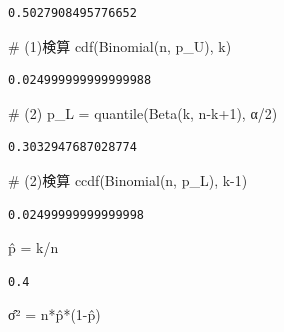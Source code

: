 \documentclass[
  letterpaper,
  DIV=11,
  numbers=noendperiod]{scrartcl}
\newenvironment{Shaded}{\begin{snugshade}}{\end{snugshade}}
\newcommand{\CommentTok}[1]{\textcolor[rgb]{0.37,0.37,0.37}{#1}}
\newcommand{\FloatTok}[1]{\textcolor[rgb]{0.68,0.00,0.00}{#1}}
\newcommand{\FunctionTok}[1]{\textcolor[rgb]{0.28,0.35,0.67}{#1}}
\newcommand{\NormalTok}[1]{\textcolor[rgb]{0.00,0.23,0.31}{#1}}
\newcommand{\OperatorTok}[1]{\textcolor[rgb]{0.37,0.37,0.37}{#1}}
\begin{document}
\begin{verbatim}
0.5027908495776652
\end{verbatim}

\begin{Shaded}
\begin{Highlighting}[]
\CommentTok{\# (1)検算}
\FunctionTok{cdf}\NormalTok{(}\FunctionTok{Binomial}\NormalTok{(n, p\_U), k)}
\end{Highlighting}
\end{Shaded}

\begin{verbatim}
0.024999999999999988
\end{verbatim}

\begin{Shaded}
\begin{Highlighting}[]
\CommentTok{\# (2)}
\NormalTok{p\_L }\OperatorTok{=} \FunctionTok{quantile}\NormalTok{(}\FunctionTok{Beta}\NormalTok{(k, n}\OperatorTok{{-}}\NormalTok{k}\OperatorTok{+}\FloatTok{1}\NormalTok{), α}\OperatorTok{/}\FloatTok{2}\NormalTok{)}
\end{Highlighting}
\end{Shaded}

\begin{verbatim}
0.3032947687028774
\end{verbatim}

\begin{Shaded}
\begin{Highlighting}[]
\CommentTok{\# (2)検算}
\FunctionTok{ccdf}\NormalTok{(}\FunctionTok{Binomial}\NormalTok{(n, p\_L), k}\OperatorTok{{-}}\FloatTok{1}\NormalTok{)}
\end{Highlighting}
\end{Shaded}

\begin{verbatim}
0.02499999999999998
\end{verbatim}

\begin{Shaded}
\begin{Highlighting}[]
\NormalTok{p̂ }\OperatorTok{=}\NormalTok{ k}\OperatorTok{/}\NormalTok{n}
\end{Highlighting}
\end{Shaded}

\begin{verbatim}
0.4
\end{verbatim}

\begin{Shaded}
\begin{Highlighting}[]
\NormalTok{σ̂² }\OperatorTok{=} \FunctionTok{n*p̂*}\NormalTok{(}\FloatTok{1}\OperatorTok{{-}}\NormalTok{p̂)}
\end{Highlighting}
\end{Shaded}
\end{document}
